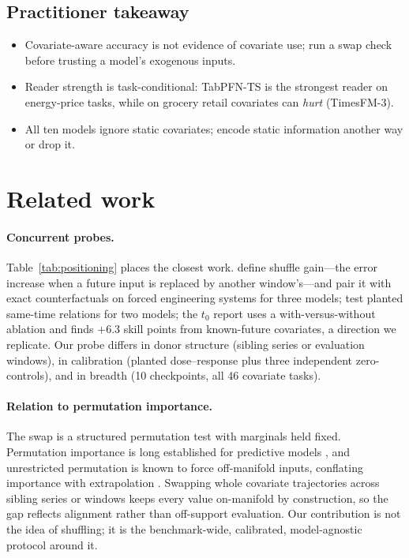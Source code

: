 \documentclass[letterpaper]{article}
\begin{document}
\subsection{Practitioner takeaway}
\begin{itemize}
\setlength{\itemsep}{0pt}
\item Covariate-aware accuracy is not evidence of covariate use; run a swap check
before trusting a model's exogenous inputs.
\item Reader strength is task-conditional: TabPFN-TS is the strongest reader on
energy-price tasks, while on grocery retail covariates can \emph{hurt} (TimesFM-3).
\item All ten models ignore static covariates; encode static information another way
or drop it.
\end{itemize}

\section{Related work}


\paragraph{Concurrent probes.} Table~\ref{tab:positioning} places the closest work.
\citet{won2026attenuated} define shuffle gain---the error increase when a future input
is replaced by another window's---and pair it with exact counterfactuals on forced
engineering systems for three models; \citet{berthelier2026investigating} test planted
same-time relations for two models; the $t_0$ report \citep{meyer2026t0} uses a
with-versus-without ablation and finds $+6.3$ skill points from known-future
covariates, a direction we replicate. Our probe differs in donor structure (sibling
series or evaluation windows), in calibration (planted dose--response plus three
independent zero-controls), and in breadth (10 checkpoints, all 46 covariate tasks).

\paragraph{Relation to permutation importance.} The swap is a structured permutation
test with marginals held fixed. Permutation importance is long established for
predictive models \citep{breiman2001}, and unrestricted permutation is known to force
off-manifold inputs, conflating importance with extrapolation \citep{hooker2021}.
Swapping whole covariate trajectories across sibling series or windows keeps every
value on-manifold by construction, so the gap reflects alignment rather than
off-support evaluation. Our contribution is not the idea of shuffling; it is the
benchmark-wide, calibrated, model-agnostic protocol around it.
\end{document}
